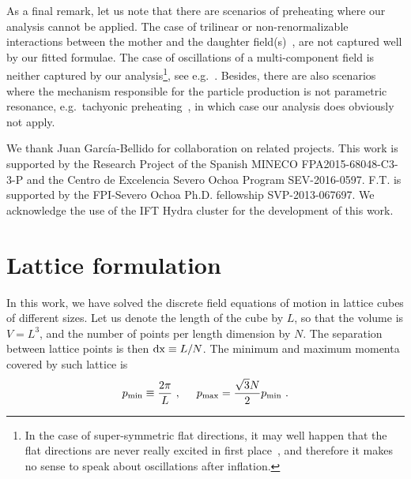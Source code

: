 \documentclass[a4paper,11pt]{article}
\newcommand{\be}{\begin{equation}}
\newcommand{\ee}{\end{equation}}
\begin{document}
As a final remark, let us note that there are scenarios of preheating where our analysis cannot be applied. The case of trilinear or non-renormalizable interactions between the mother and the daughter field(s)~\cite{Dufaux:2006ee,Croon:2015naa,Antusch:2015vna,Enqvist:2016mqj}, are not captured well by our fitted formulae. The case of oscillations of a multi-component field is neither captured by our analysis\footnote{In the case of super-symmetric flat directions, it may well happen that the flat directions are never really excited in first place~\cite{Enqvist:2011pt}, and therefore it makes no sense to speak about oscillations after inflation.}, see e.g.~\cite{Tkachev:1998dc,Olive:2006uw,Gumrukcuoglu:2008fk,DeCross:2015uza,Ballesteros:2016euj,Ballesteros:2016xej}. Besides, there are also scenarios where the mechanism responsible for the particle production is not parametric resonance, e.g.~tachyonic preheating~\cite{Felder:2000hj,Felder:2001kt,Copeland:2002ku,GarciaBellido:2002aj,GarciaBellido:2007dg,GarciaBellido:2007af,Dufaux:2008dn,DiazGil:2007dy,DiazGil:2008tf,Dufaux:2010cf,Tranberg:2017lrx}, in which case our analysis does obviously not apply.

\acknowledgments
We thank Juan Garc\'ia-Bellido for collaboration on related projects. This work is supported by the Research Project of the Spanish MINECO  FPA2015-68048-C3-3-P and the Centro de Excelencia Severo Ochoa Program SEV-2016-0597. F.T. is supported by the FPI-Severo Ochoa Ph.D. fellowship SVP-2013-067697. We acknowledge the use of the IFT Hydra cluster for the development of this work.

\appendix

\section{Lattice formulation} \label{app:Lattice-formulation}
In this work, we have solved the discrete field equations of motion in lattice cubes of different sizes. Let us denote the length of the cube by $L$, so that the volume is $V = L^3$, and the number of points per length dimension by $N$. The separation between lattice points is then ${\rm dx} \equiv L /N$. The minimum and maximum momenta covered by such lattice is 
\be p_{\rm min } \equiv \frac{2 \pi}{L} \ , \hspace{0.5cm} p_{\rm max} = \frac{\sqrt{3} N}{2} p_{\rm min} \ . \label{eq:pminpmax}\ee
\end{document}
